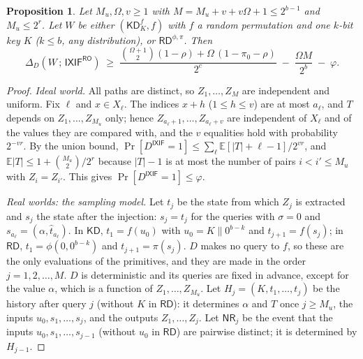 \documentclass[11pt,a4paper]{article}
\newtheorem{proposition}{Proposition}
\theoremstyle{definition}
\theoremstyle{remark}
\newcommand{\KD}{\mathsf{KD}}
\newcommand{\RD}{\mathsf{RD}}
\newcommand{\IXIF}{\mathsf{IXIF}}
\newcommand{\RO}{\mathsf{RO}}
\newcommand{\E}{\mathbb{E}}
\newcommand{\inp}[1]{\widehat{#1}}
\newcommand{\NR}{\mathsf{NR}}
\begin{document}
\begin{proposition}\label{prop:dist}
Let $M_u, \Omega, v \ge 1$ with $M = M_u + v + v\Omega + 1 \le 2^{b-1}$ and $M_u \le 2^r$. Let $W$ be either $(\KD^f_K, f)$ with
$f$ a random permutation and one $k$-bit key $K$ ($k \le b$, any distribution), or $\RD^{\phi,\pi}$. Then
\[ \Delta_D(W \,;\, \IXIF^{\RO}) \;\ge\;
 \frac{\binom{\Omega+1}{2}(1 - \rho) + \Omega\,(1 - \pi_0 - \rho)}{2^c} \;-\; \frac{\Omega M}{2^b} \;-\; \varphi . \]
\end{proposition}
\begin{proof}
\emph{Ideal world.} All paths are distinct, so $Z_1, \dots, Z_M$ are independent and uniform. Fix $\ell$ and $x \in X_\ell$.
The indices $x + h$ ($1 \le h \le v$) are at most $a_\ell$, and $T$ depends on $Z_1, \dots, Z_{M_u}$ only; hence
$Z_{a_\ell+1}, \dots, Z_{a_\ell+v}$ are independent of $X_\ell$ and of the values they are compared with, and the $v$
equalities hold with probability $2^{-vr}$. By the union bound,
$\Pr[D^{\IXIF} = 1] \le \sum_\ell \E[|T| + \ell - 1]/2^{vr}$, and $\E|T| \le 1 + \binom{M_u}{2}/2^r$ because $|T| - 1$ is at most the
number of pairs $i < i' \le M_u$ with $Z_i = Z_{i'}$. This gives $\Pr[D^{\IXIF} = 1] \le \varphi$.

\emph{Real worlds: the sampling model.} Let $t_j$ be the state from which $Z_j$ is extracted and $s_j$ the state after the
injection: $s_j = t_j$ for the queries with $\sigma = 0$ and $s_{a_\ell} = (\alpha, \inp{t}_{a_\ell})$. In $\KD$, $t_1 = f(u_0)$ with
$u_0 = K \| 0^{b-k}$ and $t_{j+1} = f(s_j)$; in $\RD$, $t_1 = \phi(0, 0^{b-k})$ and $t_{j+1} = \pi(s_j)$. $D$ makes no query to $f$,
so these are the only evaluations of the primitives, and they are made in the order $j = 1, 2, \dots, M$. $D$ is
deterministic and its queries are fixed in advance, except for the value $\alpha$, which is a function of
$Z_1, \dots, Z_{M_u}$. Let $H_j = (K, t_1, \dots, t_j)$ be the history after query $j$ (without $K$ in $\RD$): it determines
$\alpha$ and $T$ once $j \ge M_u$, the inputs $u_0, s_1, \dots, s_j$, and the outputs $Z_1, \dots, Z_j$. Let $\NR_j$ be the event
that the inputs $u_0, s_1, \dots, s_{j-1}$ (without $u_0$ in $\RD$) are pairwise distinct; it is determined by $H_{j-1}$.


\end{proof}
\end{document}
